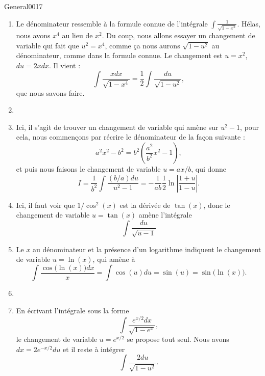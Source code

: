 \begin{corrige}{General0017}
\begin{enumerate}
\item
Le dénominateur ressemble à la formule connue de l'intégrale $\int\frac{1}{ \sqrt{1-x^2} }$. Hélas, nous avons $x^4$ au lieu de $x^2$. Du coup, nous allons essayer un changement de variable qui fait que $u^2=x^4$, comme ça nous aurons $\sqrt{1-u^2}$ au dénominateur, comme dans la formule connue. Le changement est $u=x^2$, $du=2xdx$. Il vient :
\begin{equation}
	\int\frac{ xdx }{ \sqrt{1-x^4} }=\frac{ 1 }{2}\int\frac{ du }{ \sqrt{1-u^2} },
\end{equation}
que nous savons faire.

\item
\item
Ici, il s'agit de trouver un changement de variable qui amène sur $u^2-1$, pour cela, nous commençons par récrire le dénominateur de la façon suivante :
\begin{equation}
	a^2x^2-b^2=b^2(\frac{ a^2 }{ b^2 }x^2-1),
\end{equation}
et puis nous faisons le changement de variable $u=ax/b$, qui donne
\begin{equation}
	I=\frac{1}{ b^2 }\int\frac{ (b/a)du }{ u^2-1 }=-\frac{1}{ ab }\frac{ 1 }{2}\ln\left| \frac{ 1+u }{ 1-u } \right| .
\end{equation}

\item
Ici, il faut voir que $1/\cos^2(x)$ est la dérivée de $\tan(x)$, donc le changement de variable $u=\tan(x)$ amène l'intégrale
\begin{equation}
	\int\frac{ du }{ \sqrt{u-1} }
\end{equation}

\item
Le $x$ au dénominateur et la présence d'un logarithme indiquent le changement de variable $u=\ln(x)$, qui amène à
\begin{equation}
	\int\frac{ \cos\big( \ln(x) \big)dx }{ x }=\int\cos(u)du=\sin(u)=\sin\big( \ln(x) \big).
\end{equation}

\item
\item
En écrivant l'intégrale sous la forme
\begin{equation}
	\int\frac{  e^{x/2}dx }{ \sqrt{1- e^{x}} },
\end{equation}
le changement de variable $u= e^{x/2}$ se propose tout seul. Nous avons $dx=2 e^{-x/2}du$ et il reste à intégrer
\begin{equation}
	\int\frac{ 2du }{ \sqrt{1-u^2} }.
\end{equation}


\end{enumerate}
\end{corrige}
